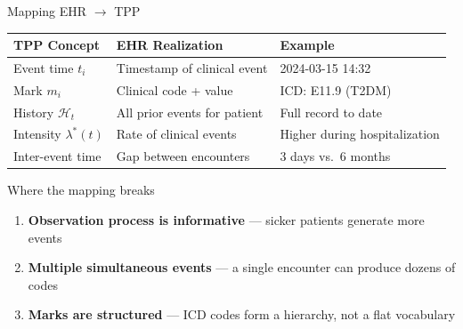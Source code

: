 \documentclass[aspectratio=169,10pt]{beamer}
\begin{document}
\begin{frame}{Mapping EHR $\to$ TPP}
\begin{center}
\begin{tabular}{lll}
\toprule
\textbf{TPP Concept} & \textbf{EHR Realization} & \textbf{Example} \\
\midrule
Event time $t_i$ & Timestamp of clinical event & 2024-03-15 14:32 \\
Mark $m_i$ & Clinical code + value & ICD: E11.9 (T2DM) \\
History $\mathcal{H}_t$ & All prior events for patient & Full record to date \\
Intensity $\lambda^*(t)$ & Rate of clinical events & Higher during hospitalization \\
Inter-event time & Gap between encounters & 3 days vs.\ 6 months \\
\bottomrule
\end{tabular}
\end{center}

\vspace{0.8em}
\begin{alertblock}{Where the mapping breaks}
\begin{enumerate}
    \item \textbf{Observation process is informative} --- sicker patients generate more events
    \item \textbf{Multiple simultaneous events} --- a single encounter can produce dozens of codes
    \item \textbf{Marks are structured} --- ICD codes form a hierarchy, not a flat vocabulary
\end{enumerate}
\end{alertblock}
\end{frame}
\end{document}
